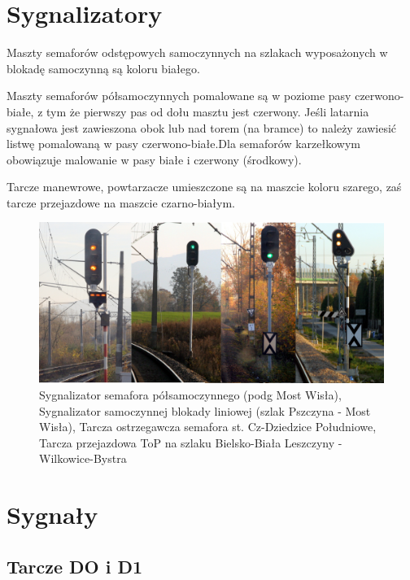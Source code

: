 \section{Sygnalizatory}

Maszty semaforów odstępowych samoczynnych na szlakach wyposażonych w blokadę samoczynną są koloru białego.

Maszty semaforów półsamoczynnych pomalowane są w poziome pasy czerwono-białe, z tym że pierwszy pas od dołu masztu jest czerwony. Jeśli latarnia sygnałowa jest zawieszona obok lub nad torem (na bramce) to należy zawiesić listwę pomalowaną
w pasy czerwono-białe.Dla semaforów karzełkowym obowiązuje malowanie w pasy białe i czerwony (środkowy).

Tarcze manewrowe, powtarzacze umieszczone są na maszcie koloru szarego, zaś tarcze przejazdowe na maszcie czarno-białym.

	\begin{figure}
		\includegraphics[width=15cm]{skryptkierownik-img/sygnalizatory.png}
		\caption{Sygnalizator semafora półsamoczynnego (podg Most Wisła), Sygnalizator samoczynnej blokady liniowej (szlak Pszczyna - Most Wisła), Tarcza ostrzegawcza semafora st. Cz-Dziedzice Południowe, Tarcza przejazdowa ToP na szlaku Bielsko-Biała Leszczyny - Wilkowice-Bystra}
	\end{figure}


\section{Sygnały}

\subsection{Tarcze DO i D1}

